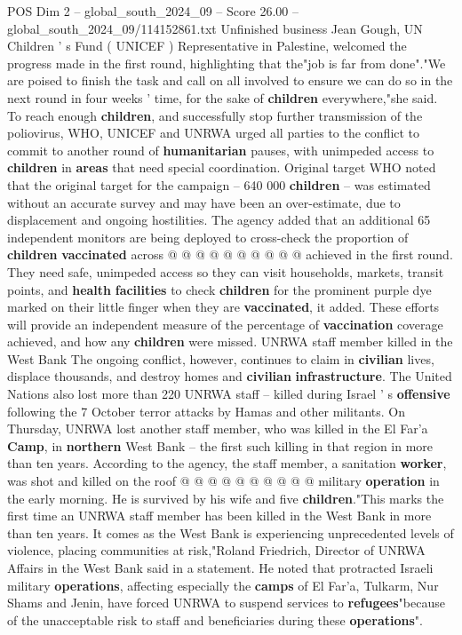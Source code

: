 \begin{textsample}{POS Dim 2 – global\_south\_2024\_09 – Score 26.00 – global\_south\_2024\_09/114152861.txt}
Unfinished business Jean Gough, UN Children ' s Fund ( UNICEF ) Representative in Palestine, welcomed the progress made in the first round, highlighting that the"job is far from done"."We are poised to finish the task and call on all involved to ensure we can do so in the next round in four weeks ' time, for the sake of \textbf{children} everywhere,"she said.
To reach enough \textbf{children}, and successfully stop further transmission of the poliovirus, WHO, UNICEF and UNRWA urged all parties to the conflict to commit to another round of \textbf{humanitarian} pauses, with unimpeded access to \textbf{children} in \textbf{areas} that need special coordination.
Original target WHO noted that the original target for the campaign -- 640 000 \textbf{children} -- was estimated without an accurate survey and may have been an over-estimate, due to displacement and ongoing hostilities.
The agency added that an additional 65 independent monitors are being deployed to cross-check the proportion of \textbf{children} \textbf{vaccinated} across @ @ @ @ @ @ @ @ @ @ achieved in the first round.
They need safe, unimpeded access so they can visit households, markets, transit points, and \textbf{health} \textbf{facilities} to check \textbf{children} for the prominent purple dye marked on their little finger when they are \textbf{vaccinated}, it added.
These efforts will provide an independent measure of the percentage of \textbf{vaccination} coverage achieved, and how any \textbf{children} were missed.
UNRWA staff member killed in the West Bank The ongoing conflict, however, continues to claim in \textbf{civilian} lives, displace thousands, and destroy homes and \textbf{civilian} \textbf{infrastructure}.
The United Nations also lost more than 220 UNRWA staff -- killed during Israel ' s \textbf{offensive} following the 7 October terror attacks by Hamas and other militants.
On Thursday, UNRWA lost another staff member, who was killed in the El Far'a \textbf{Camp}, in \textbf{northern} West Bank -- the first such killing in that region in more than ten years.
According to the agency, the staff member, a sanitation \textbf{worker}, was shot and killed on the roof @ @ @ @ @ @ @ @ @ @ military \textbf{operation} in the early morning.
He is survived by his wife and five \textbf{children}."This marks the first time an UNRWA staff member has been killed in the West Bank in more than ten years.
It comes as the West Bank is experiencing unprecedented levels of violence, placing communities at risk,"Roland Friedrich, Director of UNRWA Affairs in the West Bank said in a statement.
He noted that protracted Israeli military \textbf{operations}, affecting especially the \textbf{camps} of El Far'a, Tulkarm, Nur Shams and Jenin, have forced UNRWA to suspend services to \textbf{refugees}"because of the unacceptable risk to staff and beneficiaries during these \textbf{operations}".

\end{textsample}
